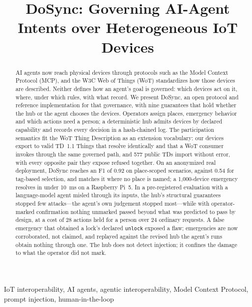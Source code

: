 \documentclass[conference]{IEEEtran}
\newcommand{\code}[1]{\texttt{#1}}
\begin{document}
\title{DoSync: Governing AI-Agent Intents over Heterogeneous IoT Devices}

\author{
}

\maketitle

\begin{abstract}
AI agents now reach physical devices through protocols such as the Model Context Protocol (MCP), and the W3C Web of Things (WoT) standardizes how those devices are described. Neither defines how an agent's goal is governed: which devices act on it, where, under which rules, with what record. We present DoSync, an open protocol and reference implementation for that governance, with nine guarantees that hold whether the hub or the agent chooses the devices. Operators assign places, emergency behavior and which actions need a person; a deterministic hub admits devices by declared capability and records every decision in a hash-chained log. The participation semantics fit the WoT Thing Description as an extension vocabulary: our devices export to valid TD~1.1 Things that resolve identically and that a WoT consumer invokes through the same governed path, and 577 public TDs import without error, with every opposite pair they expose refused together. On an anonymized real deployment, DoSync reaches an F1 of 0.92 on place-scoped scenarios, against 0.54 for tag-based selection, and matches it where no place is named; a 1{,}000-device emergency resolves in under 10~ms on a Raspberry Pi~5. In a pre-registered evaluation with a language-model agent misled through its inputs, the hub's structural guarantees stopped few attacks---the agent's own judgement stopped most---while with operator-marked confirmation nothing unmarked passed beyond what was predicted to pass by design, at a cost of 28 actions held for a person over 24 ordinary requests. A false emergency that obtained a lock's declared \code{unlock} exposed a flaw; emergencies are now corroborated, not claimed, and replayed against the revised hub the agent's runs obtain nothing through one. The hub does not detect injection; it confines the damage to what the operator did not mark.
\end{abstract}

\begin{IEEEkeywords}
IoT interoperability, AI agents, agentic interoperability, Model Context Protocol, prompt injection, human-in-the-loop
\end{IEEEkeywords}
\end{document}
